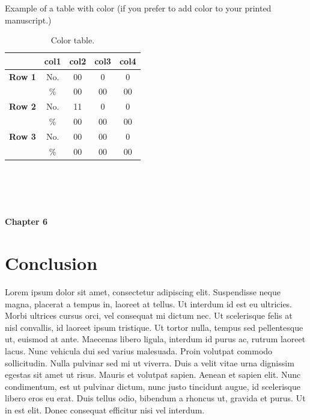 \documentclass[12pt]{article}  %
\theoremstyle{plain}
\begin{document}
Example of a table with color (if you prefer to add color to your printed manuscript.)

\begin{table}[ht!]
\centering
\begin{tabular}{|c|c|c|c|c|}
  \hline
  & col1 & col2 & col3&col4  \\ \hline
  \rowcolor[HTML]{FAAC58} 
  \textbf{Row 1} & No. & 00 & 0&0  \\ \hline
  \rowcolor[HTML]{FAAC58}  
  & \% &00 & 00&00  \\ \hline
  \rowcolor[HTML]{F3F781}  
  \textbf{Row 2} & No. & 11& 0&0 \\ \hline
  \rowcolor[HTML]{F3F781}  
  & \% &00& 00&00 \\ \hline
  \rowcolor[HTML]{D8F781 } 
  \textbf{Row 3} & No. &00 & 00&0  \\
  \hline
  \rowcolor[HTML]{D8F781}  
  & \% &00& 00&00 \\

  \hline
\end{tabular}
\caption{Color table.}
\label{table:local_surveys2}
\end{table}
\newpage
\newpage
\noindent
\\\\\\\\
{\LARGE \bf Chapter 6}
\section{Conclusion}
\label{section:conclusion}
Lorem ipsum dolor sit amet, consectetur adipiscing elit. Suspendisse neque magna, placerat a tempus in, laoreet at tellus. Ut interdum id est eu ultricies. Morbi ultrices cursus orci, vel consequat mi dictum nec. Ut scelerisque felis at nisl convallis, id laoreet ipsum tristique. Ut tortor nulla, tempus sed pellentesque ut, euismod at ante. Maecenas libero ligula, interdum id purus ac, rutrum laoreet lacus. Nunc vehicula dui sed varius malesuada. Proin volutpat commodo sollicitudin. Nulla pulvinar sed mi ut viverra. Duis a velit vitae urna dignissim egestas sit amet ut risus. Mauris et volutpat sapien. Aenean et sapien elit. Nunc condimentum, est ut pulvinar dictum, nunc justo tincidunt augue, id scelerisque libero eros eu erat. Duis tellus odio, bibendum a rhoncus ut, gravida et purus. Ut in est elit. Donec consequat efficitur nisi vel interdum.



\newpage

\appendix

\end{document}

